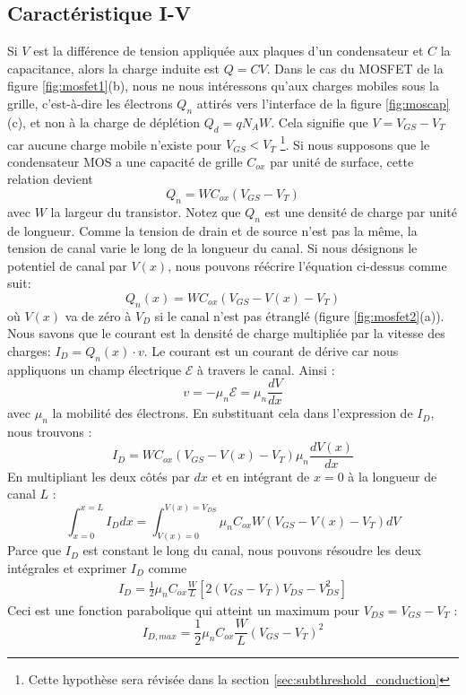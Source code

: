 \subsection{Caractéristique I-V}
\label{sec:MOS_IV}
Si $V$ est la différence de tension appliquée aux plaques d'un condensateur et $C$ la capacitance, alors la charge induite est $Q = CV$. Dans le cas du MOSFET de la figure \ref{fig:mosfet1}(b), nous ne nous intéressons qu'aux charges mobiles sous la grille, c'est-à-dire les électrons $Q_n$ attirés vers l'interface de la figure \ref{fig:moscap}(c), et non à la charge de déplétion $Q_d=qN_AW$. Cela signifie que $V=V_{GS}-V_T$ car aucune charge mobile n'existe pour $V_{GS}<V_T$ \footnote{Cette hypothèse sera révisée dans la section \ref{sec:subthreshold_conduction}}. Si nous supposons que le condensateur MOS a une capacité de grille $C_{ox}$ par unité de surface, cette relation devient
$$Q_n = W C_{ox} (V_{GS} - V_T)$$
avec $W$ la largeur du transistor. Notez que $Q_n$ est une densité de charge par unité de longueur. Comme la tension de drain et de source n'est pas la même, la tension de canal varie le long de la longueur du canal. Si nous désignons le potentiel de canal par $V(x)$, nous pouvons réécrire l'équation ci-dessus comme suit:
$$Q_n(x) = W C_{ox} (V_{GS} - V(x) - V_T)$$
où $V(x)$ va de zéro à $V_D$ si le canal n'est pas étranglé (figure \ref{fig:mosfet2}(a)).\\
Nous savons que le courant est la densité de charge multipliée par la vitesse des charges: $I_D=Q_n(x)\cdot v$. Le courant est un courant de dérive car nous appliquons un champ électrique $\mathcal{E}$ à travers le canal. Ainsi :
$$v = -\mu_n \mathcal{E} = \mu_n \frac{dV}{dx}$$
avec $\mu_n$ la mobilité des électrons. En substituant cela dans l'expression de $I_D$, nous trouvons :
$$I_D = W C_{ox} (V_{GS} - V(x) - V_T) \mu_n \frac{dV(x)}{dx}$$
En multipliant les deux côtés par $dx$ et en intégrant de $x = 0$ à la longueur de canal $L$ :
$$
 \int_{x=0}^{x=L} I_D dx = \int_{V(x)=0}^{V(x)=V_{DS}} \mu_n C_{ox} W (V_{GS}-V(x)-V_T)dV 
$$
Parce que $I_D$ est constant le long du canal, nous pouvons résoudre les deux intégrales et exprimer $I_D$ comme
\begin{equation}
\begin{split}
    I_D = \frac{1}{2} \mu_n C_{ox} \frac{W}{L} [ 2(V_{GS} - V_T) V_{DS} - V_{DS}^2 ]
\end{split}
\end{equation}
Ceci est une fonction parabolique qui atteint un maximum pour $V_{DS} = V_{GS} - V_T$ :
$$I_{D, max} = \frac{1}{2} \mu_n C_{ox} \frac{W}{L} (V_{GS} - V_T)^2$$
